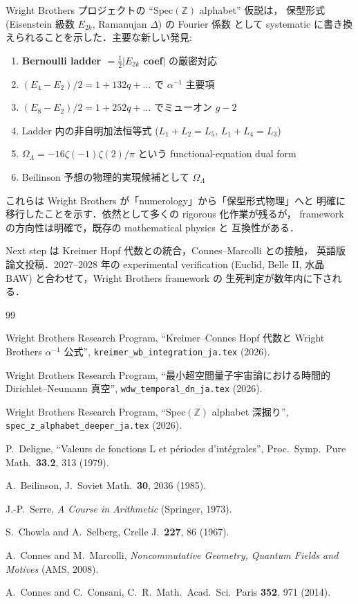 \documentclass[11pt,a4paper]{article}
\begin{document}
Wright Brothers プロジェクトの ``Spec$(\mathbb{Z})$ alphabet'' 仮説は，
保型形式 (Eisenstein 級数 $E_{2k}$, Ramanujan $\Delta$) の Fourier 係数
として systematic に書き換えられることを示した．主要な新しい発見:

\begin{enumerate}
\item \textbf{Bernoulli ladder $= \frac{1}{2}|E_{2k}$ coef$|$} の厳密対応
\item $(E_4 - E_2)/2 = 1 + 132 q + \ldots$ で $\alpha^{-1}$ 主要項
\item $(E_8 - E_2)/2 = 1 + 252 q + \ldots$ でミューオン $g-2$
\item Ladder 内の非自明加法恒等式 ($L_1 + L_2 = L_5$, $L_1 + L_4 = L_3$)
\item $\Omega_\Lambda = -16 \zeta(-1)\zeta(2)/\pi$ という
functional-equation dual form
\item Beilinson 予想の物理的実現候補として $\Omega_\Lambda$
\end{enumerate}

これらは Wright Brothers が「numerology」から「保型形式物理」へと
明確に移行したことを示す．依然として多くの rigorous 化作業が残るが，
framework の方向性は明確で，既存の mathematical physics と
互換性がある．

Next step は Kreimer Hopf 代数との統合，Connes--Marcolli との接触，
英語版論文投稿．2027--2028 年の experimental verification
(Euclid, Belle II, 水晶 BAW) と合わせて，Wright Brothers framework の
生死判定が数年内に下される．

\begin{thebibliography}{99}

Wright Brothers Research Program,
``Kreimer--Connes Hopf 代数と Wright Brothers $\alpha^{-1}$ 公式'',
\texttt{kreimer\_wb\_integration\_ja.tex} (2026).

Wright Brothers Research Program,
``最小超空間量子宇宙論における時間的 Dirichlet--Neumann 真空'',
\texttt{wdw\_temporal\_dn\_ja.tex} (2026).

Wright Brothers Research Program, ``Spec$(\mathbb{Z})$ alphabet 深掘り'',
\texttt{spec\_z\_alphabet\_deeper\_ja.tex} (2026).

P.~Deligne, ``Valeurs de fonctions L et périodes d'intégrales'',
Proc.\ Symp.\ Pure Math.\ \textbf{33.2}, 313 (1979).

A.~Beilinson, J.\ Soviet Math.\ \textbf{30}, 2036 (1985).

J.-P.~Serre, \textit{A Course in Arithmetic} (Springer, 1973).

S.~Chowla and A.~Selberg, Crelle J.\ \textbf{227}, 86 (1967).

A.~Connes and M.~Marcolli, \textit{Noncommutative Geometry,
Quantum Fields and Motives} (AMS, 2008).

A.~Connes and C.~Consani, C.\ R.\ Math.\ Acad.\ Sci.\ Paris
\textbf{352}, 971 (2014).

\end{thebibliography}
\end{document}
